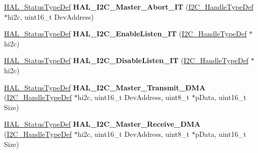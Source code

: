 \begin{DoxyCompactItemize}
\hyperlink{stm32f1xx__hal__def_8h_a63c0679d1cb8b8c684fbb0632743478f}{H\+A\+L\+\_\+\+Status\+Type\+Def} {\bfseries H\+A\+L\+\_\+\+I2\+C\+\_\+\+Master\+\_\+\+Abort\+\_\+\+IT} (\hyperlink{struct_i2_c___handle_type_def}{I2\+C\+\_\+\+Handle\+Type\+Def} $\ast$hi2c, uint16\+\_\+t Dev\+Address)
\item 
\mbox{\label{group___i2_c___exported___functions___group2_gad8c3b67e4430bc8def0c885af769f3ab}} 
\hyperlink{stm32f1xx__hal__def_8h_a63c0679d1cb8b8c684fbb0632743478f}{H\+A\+L\+\_\+\+Status\+Type\+Def} {\bfseries H\+A\+L\+\_\+\+I2\+C\+\_\+\+Enable\+Listen\+\_\+\+IT} (\hyperlink{struct_i2_c___handle_type_def}{I2\+C\+\_\+\+Handle\+Type\+Def} $\ast$hi2c)
\item 
\mbox{\label{group___i2_c___exported___functions___group2_gafd49a2b08bc6e30989c420a9c679b65e}} 
\hyperlink{stm32f1xx__hal__def_8h_a63c0679d1cb8b8c684fbb0632743478f}{H\+A\+L\+\_\+\+Status\+Type\+Def} {\bfseries H\+A\+L\+\_\+\+I2\+C\+\_\+\+Disable\+Listen\+\_\+\+IT} (\hyperlink{struct_i2_c___handle_type_def}{I2\+C\+\_\+\+Handle\+Type\+Def} $\ast$hi2c)
\item 
\mbox{\label{group___i2_c___exported___functions___group2_ga978126d41a3a67384f4cb2fe3e6e7e8f}} 
\hyperlink{stm32f1xx__hal__def_8h_a63c0679d1cb8b8c684fbb0632743478f}{H\+A\+L\+\_\+\+Status\+Type\+Def} {\bfseries H\+A\+L\+\_\+\+I2\+C\+\_\+\+Master\+\_\+\+Transmit\+\_\+\+D\+MA} (\hyperlink{struct_i2_c___handle_type_def}{I2\+C\+\_\+\+Handle\+Type\+Def} $\ast$hi2c, uint16\+\_\+t Dev\+Address, uint8\+\_\+t $\ast$p\+Data, uint16\+\_\+t Size)
\item 
\mbox{\label{group___i2_c___exported___functions___group2_ga299f5e16a92826b9856c60265bc22cf2}} 
\hyperlink{stm32f1xx__hal__def_8h_a63c0679d1cb8b8c684fbb0632743478f}{H\+A\+L\+\_\+\+Status\+Type\+Def} {\bfseries H\+A\+L\+\_\+\+I2\+C\+\_\+\+Master\+\_\+\+Receive\+\_\+\+D\+MA} (\hyperlink{struct_i2_c___handle_type_def}{I2\+C\+\_\+\+Handle\+Type\+Def} $\ast$hi2c, uint16\+\_\+t Dev\+Address, uint8\+\_\+t $\ast$p\+Data, uint16\+\_\+t Size)
\item 
\mbox{\label{group___i2_c___exported___functions___group2_ga59e69e0da57150f980deea0d235f0397}} 

\end{DoxyCompactItemize}
